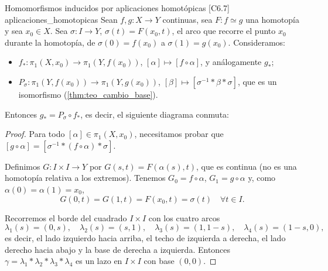 \begin{teorema}{Homomorfismos inducidos por aplicaciones homotópicas [C6.7] \marcaT}{aplicaciones_homotopicas}
Sean $f, g \colon X \to Y$ continuas, sea $F \colon f \simeq g$ una homotopía y sea $x_0 \in X$. Sea $\sigma \colon I \to Y$, $\sigma(t) = F(x_0, t)$, el arco que recorre el punto $x_0$ durante la homotopía, de $\sigma(0) = f(x_0)$ a $\sigma(1) = g(x_0)$. Consideramos:
\begin{itemize}
    \item $f_* \colon \pi_1(X,x_0) \to \pi_1(Y,f(x_0))$, $[\alpha] \mapsto [f \circ \alpha]$, y análogamente $g_*$;
    \item $P_\sigma \colon \pi_1(Y,f(x_0)) \to \pi_1(Y,g(x_0))$, $[\beta] \mapsto [\sigma^{-1} * \beta * \sigma]$, que es un isomorfismo (\cref{thm:teo_cambio_base}).
\end{itemize}
Entonces $g_* = P_\sigma \circ f_*$, es decir, el siguiente diagrama conmuta:
\begin{center}
\end{center}

\begin{proof}
Para todo $[\alpha] \in \pi_1(X, x_0)$, necesitamos probar que $[g \circ \alpha] = [\sigma^{-1} * (f \circ \alpha) * \sigma]$.

Definimos $G \colon I \times I \longrightarrow Y$ por $G(s,t) = F(\alpha(s), t)$, que es continua (no es una homotopía relativa a los extremos). Tenemos $G_0 = f \circ \alpha$, $G_1 = g \circ \alpha$ y, como $\alpha(0) = \alpha(1) = x_0$,
\[ G(0,t) = G(1,t) = F(x_0,t) = \sigma(t) \quad \forall t \in I. \]

Recorremos el borde del cuadrado $I \times I$ con los cuatro arcos
\[ \lambda_1(s) = (0,s), \quad \lambda_2(s) = (s,1), \quad \lambda_3(s) = (1,1-s), \quad \lambda_4(s) = (1-s,0), \]
es decir, el lado izquierdo hacia arriba, el techo de izquierda a derecha, el lado derecho hacia abajo y la base de derecha a izquierda. Entonces $\gamma = \lambda_1 * \lambda_2 * \lambda_3 * \lambda_4$ es un lazo en $I \times I$ con base $(0,0)$.


\end{proof}
\end{teorema}
